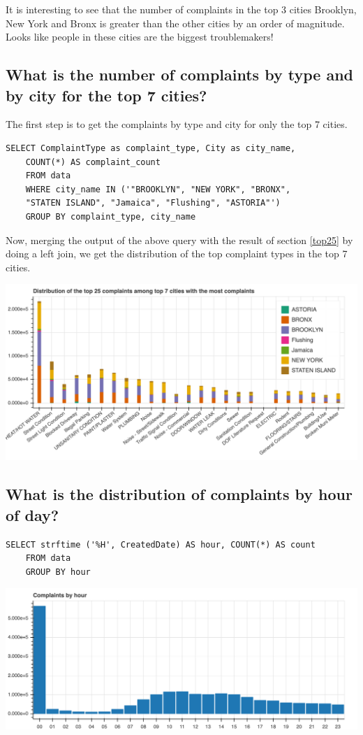 \documentclass[12pt,a4paper]{article}
\begin{document}
It is interesting to see that the number of complaints in the top 3 cities Brooklyn, New York and  Bronx is greater than the other cities by an order of magnitude. Looks like people in these cities are the biggest troublemakers!

\subsection{What is the number of complaints by type and by city for the top 7 cities?}
The first step is to get the complaints by type and city for only the top 7 cities.
\begin{verbatim}
SELECT ComplaintType as complaint_type, City as city_name,
    COUNT(*) AS complaint_count
    FROM data
    WHERE city_name IN ('"BROOKLYN", "NEW YORK", "BRONX",
    "STATEN ISLAND", "Jamaica", "Flushing", "ASTORIA"')
    GROUP BY complaint_type, city_name
\end{verbatim}

Now, merging the output of the above query with the result of section \ref{top25} by doing a left join, we get the distribution of the top complaint types in the top 7 cities.

\includegraphics[scale=0.3]{topcomplaintsfortop7cities}

\subsection{What is the distribution of complaints by hour of day?}
\begin{verbatim}
SELECT strftime ('%H', CreatedDate) AS hour, COUNT(*) AS count
    FROM data
    GROUP BY hour
\end{verbatim}

\includegraphics[scale=0.3]{complaintsbyhour}
\end{document}
